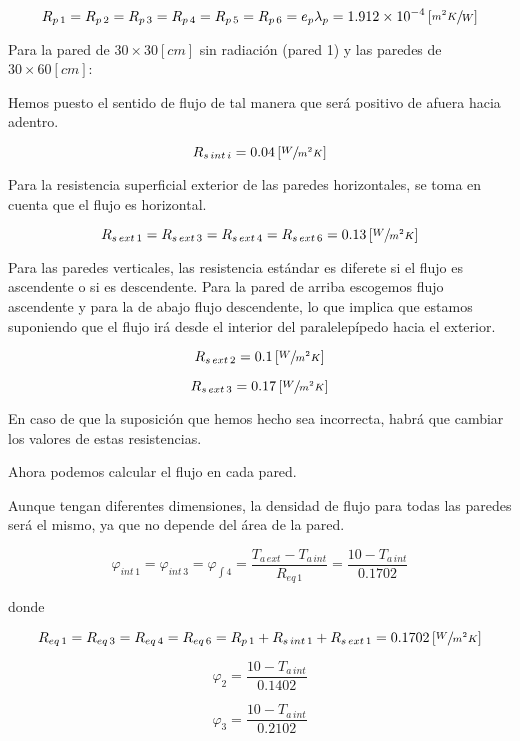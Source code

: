 \documentclass[11pt]{article}
\begin{document}
\[ R_{ p \, 1 } = R_{ p \, 2 } = R_{ p \, 3 } = R_{ p \, 4 } = R_{ p \, 5 } = R_{ p \, 6 } = e_p \lambda _p = 1.912 \times 10 ^{ -4 } \left[ \sfrac{ m ^2 K }{ W } \right] \]

Para la pared de $ 30 \times 30 \left[ cm \right] $ sin radiación (pared 1) y las paredes de $ 30 \times 60 \left[ cm \right] $: 

Hemos puesto el sentido de flujo de tal manera que será positivo de afuera hacia adentro.

\[ R_{ s \, int \, i } = 0.04 \left[ \sfrac{ W }{ m ^2 K } \right] \]

Para la resistencia superficial exterior de las paredes horizontales, se toma en cuenta que el flujo es horizontal.

\[ R_{ s \, ext \, 1 } = R_{ s \, ext \, 3 } = R_{ s \, ext \, 4 } = R_{ s \, ext \, 6 } = 0.13 \left[ \sfrac{ W }{ m ^2 K } \right] \]

Para las paredes verticales, las resistencia estándar es diferete si el flujo es ascendente o si es descendente. Para la pared de arriba escogemos flujo ascendente y para la de abajo flujo descendente, lo que implica que estamos suponiendo que el flujo irá desde el interior del paralelepípedo hacia el exterior.

\[ R_{ s \, ext \, 2 } = 0.1 \left[ \sfrac{ W }{ m^2 K } \right] \]

\[ R_{ s \, ext \, 3 } = 0.17 \left[ \sfrac{ W }{ m^2 K } \right] \]

En caso de que la suposición que hemos hecho sea incorrecta, habrá que cambiar los valores de estas resistencias.

Ahora podemos calcular el flujo en cada pared.

Aunque tengan diferentes dimensiones, la densidad de flujo para todas las paredes será el mismo, ya que no depende del área de la pared.

\[ \varphi _{ int \, 1 } = \varphi _{ int \, 3 } = \varphi _{ \int 4 } = \frac{ T_{ a \, ext } - T_{ a \, int } }{ R_{ eq \, 1 } } = \frac{ 10 - T_{ a \, int } }{ 0.1702 } \]

donde

\[ R_{ eq \, 1 } = R_{ eq \, 3 } = R_{ eq \, 4 } = R_{ eq \, 6 } = R_{ p \, 1 } + R_{ s \, int \, 1 } + R_{ s \, ext \, 1 } = 0.1702 \left[ \sfrac{ W }{ m ^2 K } \right] \]

\[ \varphi _2 = \frac{ 10 - T_{ a \, int } }{ 0.1402 } \]

\[ \varphi _3 = \frac{ 10 - T_{ a \, int } }{ 0.2102 } \]
\end{document}
